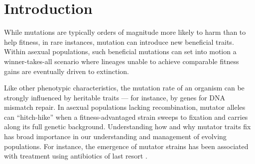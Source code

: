 

\section{Introduction} \label{sec:introduction}

While mutations are typically orders of magnitude more likely to harm than to help fitness,
in rare instances, mutation can introduce new beneficial traits.
Within asexual populations, such beneficial mutations can set into motion a winner-takes-all scenario where lineages unable to achieve comparable fitness gains are eventually driven to extinction.

Like other phenotypic characteristics, the mutation rate of an organism can be strongly influenced by heritable traits --- for instance, by genes for DNA mismatch repair. %
In asexual populations lacking recombination, mutator alleles can  ``hitch-hike'' when a fitness-advantaged strain sweeps to fixation and carries along its full genetic background.
Understanding how and why mutator traits fix has broad importance in our understanding and management of evolving populations.
For instance, the emergence of mutator strains has been associated with treatment using antibiotics of last resort \citep{mehta2019essential}.

